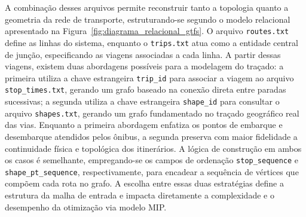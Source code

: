 \documentclass[cic,tc]{infufrgs}
\begin{document}
A combinação desses arquivos permite reconstruir tanto a topologia quanto a geometria da rede de transporte, estruturando-se segundo o modelo relacional apresentado na Figura~\ref{fig:diagrama_relacional_gtfs}. O arquivo \texttt{routes.txt} define as linhas do sistema, enquanto o \texttt{trips.txt} atua como a entidade central de junção, especificando as viagens associadas a cada linha. A partir dessas viagens, existem duas abordagens possíveis para a modelagem do traçado: a primeira utiliza a chave estrangeira \texttt{trip\_id} para associar a viagem ao arquivo \texttt{stop\_times.txt}, gerando um grafo baseado na conexão direta entre paradas sucessivas; a segunda utiliza a chave estrangeira \texttt{shape\_id} para consultar o arquivo \texttt{shapes.txt}, gerando um grafo fundamentado no traçado geográfico real das vias. Enquanto a primeira abordagem enfatiza os pontos de embarque e desembarque atendidos pelos ônibus, a segunda preserva com maior fidelidade a continuidade física e topológica dos itinerários. A lógica de construção em ambos os casos é semelhante, empregando-se os campos de ordenação \texttt{stop\_sequence} e \texttt{shape\_pt\_sequence}, respectivamente, para encadear a sequência de vértices que compõem cada rota no grafo. A escolha entre essas duas estratégias define a estrutura da malha de entrada e impacta diretamente a complexidade e o desempenho da otimização via modelo MIP.
\end{document}
